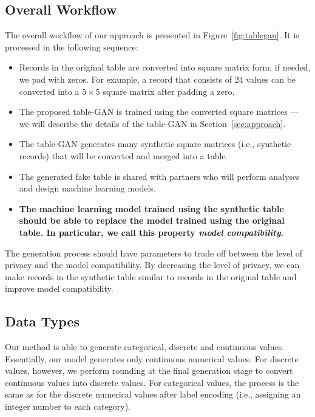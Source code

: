 
\subsection{Overall Workflow}
The overall workflow of our approach is presented in Figure~\ref{fig:tablegan}. It is processed in the following sequence:

\begin{itemize}
\item Records in the original table are converted into square matrix form; if needed, we pad with zeros. For example, a record that consists of 24 values can be converted into a $5 \times 5$ square matrix after padding a zero.
\item The proposed table-GAN is trained using the converted square matrices --- we will describe the details of the table-GAN in Section~\ref{sec:approach}.
\item The table-GAN generates many synthetic square matrices (i.e., synthetic records) that will be converted and merged into a table.
\item The generated fake table is shared with partners who will perform analyses and design machine learning models.
\item \textbf{The machine learning model trained using the synthetic table should be able to replace the model trained using the original table. In particular, we call this property \textit{model compatibility}.}
\end{itemize}

The generation process should have parameters to trade off between the level of privacy and the model compatibility. By decreasing the level of privacy, we can make records in the synthetic table similar to records in the original table and improve model compatibility.

\subsection{Data Types}
Our method is able to generate categorical, discrete and continuous values. Essentially, our model generates only continuous numerical values. For discrete values, however, we perform rounding at the final generation stage to convert continuous values into discrete values. For categorical values, the process is the same as for the discrete numerical values after label encoding (i.e., assigning an integer number to each category).%

